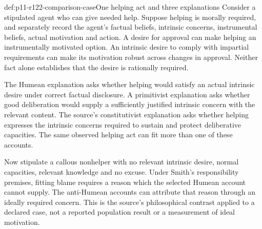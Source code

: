 \begin{hbexample}{def:p11-r122-comparison-case}{One helping act and three explanations}
Consider a stipulated agent who can give needed help. Suppose helping
is morally required, and separately record the agent's factual beliefs,
intrinsic concerns, instrumental beliefs, actual motivation and action.
A desire for approval can make helping an instrumentally motivated
option. An intrinsic desire to comply with impartial requirements can
make its motivation robust across changes in approval. Neither fact
alone establishes that the desire is rationally required.

The Humean explanation asks whether helping would satisfy an actual
intrinsic desire under correct factual disclosure. A primitivist
explanation asks whether good deliberation would supply a sufficiently
justified intrinsic concern with the relevant content. The source's
constitutivist explanation asks whether helping expresses the intrinsic
concerns required to sustain and protect deliberative capacities.
The same observed helping act can fit more than one of these accounts.

Now stipulate a callous nonhelper with no relevant intrinsic desire,
normal capacities, relevant knowledge and no excuse. Under Smith's
responsibility premises, fitting blame requires a reason which the
selected Humean account cannot supply. The anti-Humean accounts can
attribute that reason through an ideally required concern. This is the
source's philosophical contrast applied to a declared case, not a
reported population result or a measurement of ideal motivation.
\end{hbexample}

